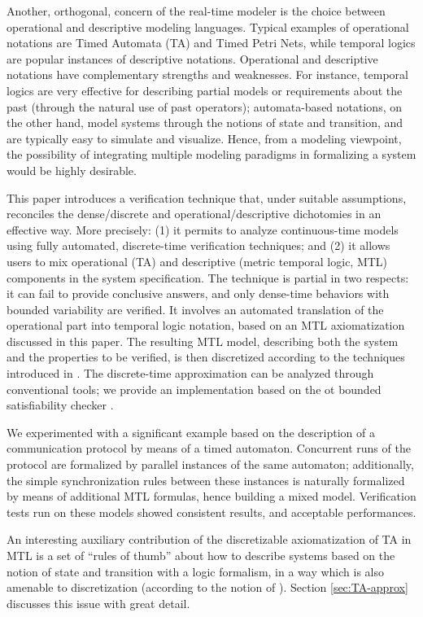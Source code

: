 \documentclass[a4paper]{article}
\newcommand{\zot}{ot}
\theoremstyle{plain}
\theoremstyle{definition}
\begin{document}
Another, orthogonal, concern of the real-time modeler is the choice between operational and descriptive modeling languages.
Typical examples of operational notations are Timed Automata (TA) and Timed Petri Nets, while temporal logics are popular instances of descriptive notations.
Operational and descriptive notations have complementary strengths and weaknesses.
For instance, temporal logics are very effective for describing partial models or requirements about the past (through the natural use of past operators); automata-based notations, on the other hand, model systems through the notions of state and transition, and are typically easy to simulate and visualize.
Hence, from a modeling viewpoint, the possibility of integrating multiple modeling paradigms in formalizing a system would be highly desirable.

This paper introduces a verification technique that, under suitable assumptions, reconciles the dense/discrete and operational/descriptive dichotomies in an effective way.
More precisely: (1) it permits to analyze continuous-time models using fully automated, discrete-time verification techniques; and (2) it allows users to mix operational (TA) and descriptive (metric temporal logic, MTL) components in the system specification.
The technique is partial in two respects: it can fail to provide conclusive answers, and only dense-time behaviors with bounded variability are verified.
It involves an automated translation of the operational part into temporal logic notation, based on an MTL axiomatization discussed in this paper.
The resulting MTL model, describing both the system and the properties to be verified, is then discretized according to the techniques introduced in \cite{FPR08-FM08}.
The discrete-time approximation can be analyzed through conventional tools; we provide an implementation based on the \zot{} bounded satisfiability checker \cite{zot}.

We experimented with a significant example based on the description of a communication protocol by means of a timed automaton.
Concurrent runs of the protocol are formalized by parallel instances of the same automaton; additionally, the simple synchronization rules between these instances is naturally formalized by means of additional MTL formulas, hence building a mixed model.
Verification tests run on these models showed consistent results, and acceptable performances.

An interesting auxiliary contribution of the discretizable axiomatization of TA in MTL is a set of ``rules of thumb'' about how to describe systems based on the notion of state and transition with a logic formalism, in a way which is also amenable to discretization (according to the notion of \cite{FPR08-FM08}).
Section \ref{sec:TA-approx} discusses this issue with great detail.
\end{document}
